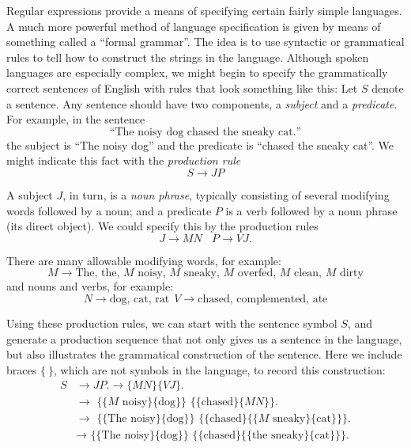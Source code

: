 \documentclass{article}
\begin{document}
Regular expressions provide a means of specifying certain fairly simple languages. A much more powerful method of language specification is given by means of something called a ``formal grammar''. The idea is to use syntactic or grammatical rules to tell how to construct the strings in the language. Although spoken languages are especially complex, we might begin to specify the grammatically correct sentences of English with rules that look something like this: Let $S$ denote a sentence. Any sentence should have two components, a \emph{subject} and a \emph{predicate}. For example, in the sentence
\begin{equation*}
\text{``The noisy dog chased the sneaky cat.''}
\end{equation*}
the subject is ``The noisy dog'' and the predicate is ``chased the sneaky cat''. We might indicate this fact with the \emph{production rule}
\begin{equation*}
S \to JP
\end{equation*}

A subject $J$, in turn, is a \emph{noun phrase}, typically consisting of several modifying words followed by a noun; and a predicate $P$ is a verb followed by a noun phrase (its direct object). We could specify this by the production rules
\begin{equation*}
J \to MN \ \ \ \ P \to VJ.
\end{equation*}

There are many allowable modifying words, for example:
\begin{equation*}
M \to \text{The, the, $M$ noisy, $M$ sneaky, $M$ overfed, $M$ clean, $M$ dirty}
\end{equation*}
and nouns and verbs, for example:
\begin{equation*}
N \to \text{dog, cat, rat} \ \ V \to \text{chased, complemented, ate}
\end{equation*}

Using these production rules, we can start with the sentence symbol $S$, and generate a production sequence that not only gives us a sentence in the language, but also illustrates the grammatical construction of the sentence. Here we include braces $\{\ \}$, which are not symbols in the language, to record this construction:
\begin{align*}
S & \to JP. \to \{MN\} \{VJ\}. \\
  & \to \text{ \{ \{$M$ noisy\} \{dog\} \}\ \{ \{chased\} \{$MN$\} \}.} \\
  & \to \text{ \{ \{The noisy\} \{dog\} \}\ \{ \{chased\} \{ \{$M$ sneaky\} \{cat\} \} \}.} \\
  & \to \text{ \{ \{The noisy\} \{dog\} \}\ \{ \{chased\} \{ \{the sneaky\} \{cat\} \} \}.}
\end{align*}
\end{document}
